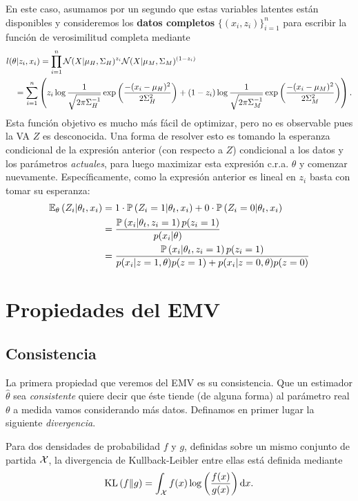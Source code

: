 En este caso, asumamos por un segundo que estas variables latentes están disponibles y consideremos los \textbf{datos completos} $\{(x_i,z_i)\}_{i=1}^n$ para escribir la función de verosimilitud completa mediante
\begin{align*}
	l(\theta|z_i,x_i) &= \prod_{i=1}^n \cN(X|\mu_H,\Sigma_H)^{z_i} \cN(X|\mu_M,\Sigma_M)^{(1-z_i)}\\
	&\hspace{-3em}= \sum_{i=1}^n \left( z_i\log\frac{1}{\sqrt{2\pi\Sigma_H^{-1}}}\expo{\frac{-(x_i-\mu_H)^2}{2\Sigma^2_H}} + (1-z_i)\log\frac{1}{\sqrt{2\pi\Sigma_M^{-1}}}\expo{\frac{-(x_i-\mu_M)^2}{2\Sigma^2_M}}\right).
\end{align*}
Esta función objetivo es mucho más fácil de optimizar, pero no es observable pues la VA $Z$ es desconocida. Una forma de resolver esto es tomando la esperanza condicional de la expresión anterior (con respecto a $Z$) condicional a los datos y los parámetros \textit{actuales}, para luego maximizar esta expresión c.r.a. $\theta$ y comenzar nuevamente. Específicamente, como la expresión anterior es lineal en $z_i$ basta con tomar su esperanza: 
\begin{align*}
	\mathbb{E}_\theta \left(Z_i|\theta_t,x_i\right) &= 1\cdot\mathbb{P} \left(Z_i=1|\theta_t,x_i\right) + 0\cdot\mathbb{P} \left(Z_i=0|\theta_t,x_i\right)\\
	&= 	\frac{\mathbb{P} \left(x_i|\theta_t,z_i=1\right) p(z_i=1)}{p(x_i|\theta)}\\
	&= 	\frac{\mathbb{P} \left(x_i|\theta_t,z_i=1\right) p(z_i=1)}{p(x_i|z=1,\theta)p(z=1)+p(x_i|z=0	,\theta)p(z=0)}
\end{align*}









\section{Propiedades del EMV} 
\label{sec:propiedades_EMV}
\subsection{Consistencia} 

La primera propiedad que veremos del EMV es su consistencia. Que un estimador $\hat\theta$ sea \textit{consistente} quiere decir que éste tiende (de alguna forma) al parámetro real $\theta$ a medida vamos considerando más datos. Definamos en primer lugar la siguiente \emph{divergencia}.

\begin{definition}
Para dos densidades de probabilidad $f$ y $g$, definidas sobre un mismo conjunto de partida ${\mathcal X}$, la divergencia de Kullback-Leibler entre ellas está definida mediante 
\begin{equation}
	\text{KL}\left(f\middle\|g\right) = \int_{\mathcal X} f(x)\log\left(\frac{f(x)}{g(x)}\right){\text{d}x}.
\end{equation}
\end{definition}

